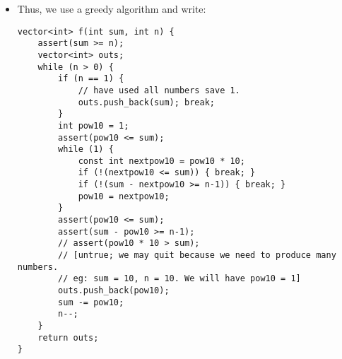 \begin{itemize}
\item Thus, we use a greedy algorithm and write:

\begin{verbatim}
vector<int> f(int sum, int n) {
    assert(sum >= n);
    vector<int> outs;
    while (n > 0) {
        if (n == 1) {
            // have used all numbers save 1.
            outs.push_back(sum); break;
        }
        int pow10 = 1;
        assert(pow10 <= sum);
        while (1) {
            const int nextpow10 = pow10 * 10;
            if (!(nextpow10 <= sum)) { break; }
            if (!(sum - nextpow10 >= n-1)) { break; }
            pow10 = nextpow10;
        }
        assert(pow10 <= sum);
        assert(sum - pow10 >= n-1);
        // assert(pow10 * 10 > sum);
        // [untrue; we may quit because we need to produce many numbers.
        // eg: sum = 10, n = 10. We will have pow10 = 1]
        outs.push_back(pow10);
        sum -= pow10;
        n--;
    }
    return outs;
}

\end{verbatim}

\end{itemize}

\newpage
